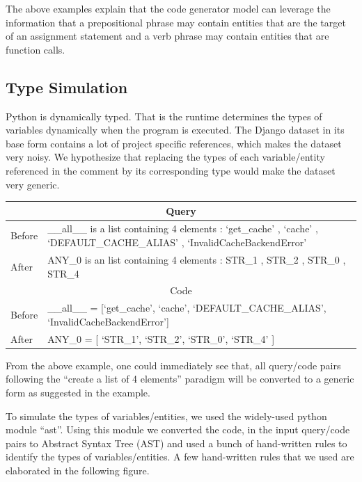 \documentclass{IEEEtran}
\begin{document}
    The above examples explain that the code generator model can leverage
    the information that a prepositional phrase may contain entities that
    are the target of an assignment statement and a verb phrase may contain
    entities that are function calls.

    \subsection{Type Simulation}
    Python is dynamically typed. That is the runtime determines the types of
    variables dynamically when the program is executed. The Django dataset
    in its base form contains a lot of project specific references, which makes
    the dataset very noisy. We hypothesize that replacing the types of each
    variable/entity referenced in the comment by its corresponding type
    would make the dataset very generic.

    \bigskip
    \begin{tabular}{ l | p{6.5cm} }
      \hline
      \multicolumn{2}{c}{Query} \\ 
      \hline
      Before & \_\_all\_\_ is a list containing 4 elements : `get\_cache' , `cache' , 
				`DEFAULT\_CACHE\_ALIAS' , `InvalidCacheBackendError' \\ 
      After & ANY\_0 is an list containing 4 elements : STR\_1 , STR\_2 , STR\_0 , STR\_4 \\ 
      \hline
      \multicolumn{2}{c}{Code} \\
      \hline
      Before & \_\_all\_\_ = [`get\_cache’, `cache’, `DEFAULT\_CACHE\_ALIAS’, 
        `InvalidCacheBackendError’] \\
      After & ANY\_0 = [ `STR\_1’, `STR\_2’, `STR\_0’, `STR\_4’ ] \\
      \hline
    \end{tabular}
    \bigskip

    From the above example, one could immediately see that, all query/code pairs following the
    ``create a list of 4 elements'' paradigm will be converted to a generic form as
    suggested in the example.

    To simulate the types of variables/entities, we used the widely-used python module
    ``ast''. Using this module we converted the code, in the input query/code pairs to
    Abstract Syntax Tree (AST) and used a bunch of hand-written rules to identify
    the types of variables/entities. A few hand-written rules that we used are
    elaborated in the following figure.
\end{document}
